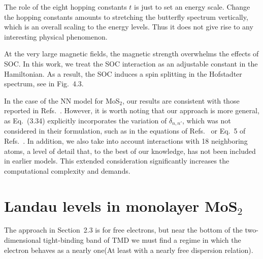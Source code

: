 The role of the eight hopping constants $t$ is just to set an energy scale. Change the hopping constants amounts to stretching the butterfly spectrum vertically, which is an overall scaling to the energy levels. Thus it does not give rise to any interesting physical phenomenon.

At the very large magnetic fields, the magnetic strength overwhelms the effects of \ac{SOC}. In this work, we treat the \ac{SOC} interaction as an adjustable constant in the Hamiltonian. As a result, the \ac{SOC} induces a spin splitting in the Hofstadter spectrum, see in Fig.~4.3.

In the case of the \ac{NN} model for MoS$_{2}$, our results are consistent with those reported in Refs.~\cite{ho2014,ho2015}. However, it is worth noting that our approach is more general, as Eq.~(3.34) explicitly incorporates the variation of $\delta_{n,n'}$, which was not considered in their formulation, such as in the equations of Refs.~\cite{ho2015} or Eq.~5 of Refs.~\cite{ho2014}. In addition, we also take into account interactions with 18 neighboring atoms, a level of detail that, to the best of our knowledge, has not been included in earlier models. This extended consideration significantly increases the computational complexity and demands.



\section{Landau levels in monolayer MoS$_{2}$}
The approach in Section~2.3 is for free electrons, but near the bottom of the two-dimensional tight-binding band of \ac{TMD} we must find a regime in which the electron behaves as a nearly one(At least with a nearly free dispersion relation). 

